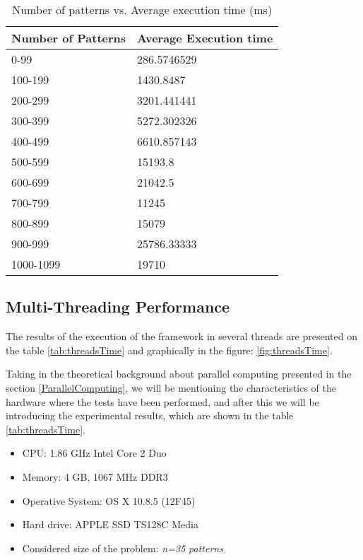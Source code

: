 \begin{table}\centering
	\caption{Number of patterns vs. Average execution time (ms)}\label{tab:patternTime}
   	\begin{tabular}{ | p{4cm\textwidth} | p{4cm\textwidth} |}
   	\hline
\textbf{Number of Patterns}  & \textbf{Average Execution time}       \\\hline
0-99       & 286.5746529 \\\hline
100-199    & 1430.8487   \\\hline
200-299    & 3201.441441 \\\hline
300-399    & 5272.302326 \\\hline
400-499    & 6610.857143 \\\hline
500-599    & 15193.8     \\\hline
600-699    & 21042.5     \\\hline
700-799    & 11245       \\\hline
800-899    & 15079       \\\hline
900-999    & 25786.33333 \\\hline
1000-1099  & 19710      \\\hline

    \end{tabular}
\end{table}

\subsection{Multi-Threading Performance}\label{MultiThreadingPerformance}

The results of the execution of the framework in several threads are presented on the table \ref{tab:threadsTime} and graphically in the figure: \ref{fig:threadsTime}. 


Taking in the theoretical background about parallel computing presented in the section \ref{ParallelComputing}, we will be mentioning the characteristics of the hardware where the tests have been performed, and after this we will be introducing the experimental results, which are shown in the table \ref{tab:threadsTime}.

\begin{itemize}
	\item CPU: 1.86 GHz Intel Core 2 Duo
	\item Memory:  4 GB, 1067 MHz DDR3
	\item Operative System: OS X 10.8.5 (12F45)
	\item Hard drive: APPLE SSD TS128C Media
	\item Considered size of the problem: \emph{n=35 patterns}
\end{itemize}

